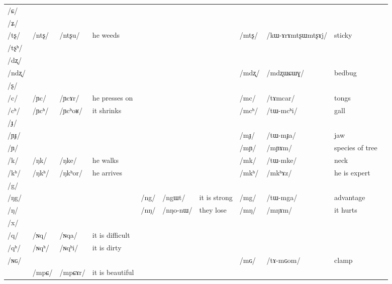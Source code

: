 \documentclass[oldfontcommands,oneside,a4paper,11pt]{article}
\newcommand{\ipa}[1]{\mbox{/#1/}} %
\newcommand{\deux}[1]{/#1/}
\newcommand{\trois}[1]{/#1/}
\begin{document}
\begin{landscape}
\begin{longtable}{l|lll|lll|lll|l}
\ipa{ɕ} 	& 	& 	& 	& 	& 	& 	& 	& 	&  \\
\ipa{ʑ} 	& 	& 	& 	& 	& 	& 	& 	& 	&  \\
\ipa{tʂ} 	& \deux{ntʂ} 	& \ipa{ntʂu} 	& he weeds	& 	& 	& 	& \deux{mtʂ} 	& \ipa{kɯ-ɤrɤmtʂɯmtʂɤj} 	& sticky \\
\ipa{tʂʰ} 	& 	& 	& 	& 	& 	& 	& 	& 	&  \\
\ipa{dʐ} 	& 	& 	& 	& 	& 	& 	& 	& 	&  \\
\ipa{ndʐ} 	& 	& 	& 	& 	& 	& 	& \deux{mdʐ} 	& \ipa{mdʐɯɕɯɣ} 	& bedbug \\
\ipa{ʂ} 	& 	& 	& 	& 	& 	& 	& 	& 	&  \\
\ipa{c} 	& \deux{ɲc} 	& \ipa{ɲcɤr} 	& he presses on	& 	& 	& 	& \deux{mc} 	& \ipa{tɤmcar} 	& tongs \\
\ipa{cʰ} 	& \deux{ɲcʰ} 	& \ipa{ɲcʰoʁ} 	& it shrinks	& 	& 	& 	& \deux{mcʰ} 	& \ipa{tɯ-mcʰi} 	& gall \\
\ipa{ɟ} 	& 	& 	& 	& 	& 	& 	& 	& 	&  \\
\ipa{ɲɟ} 	& 	& 	& 	& 	& 	& 	& \deux{mɟ} 	& \ipa{tɯ-mɟa} 	& jaw \\
\ipa{ɲ} 	& 	& 	& 	& 	& 	& 	& \deux{mɲ} 	& \ipa{mɲɤm} 	& species of tree \\
\ipa{k} 	& \deux{ŋk} 	& \ipa{ŋke} 	& he walks	& 	& 	& 	& \deux{mk} 	& \ipa{tɯ-mke} 	& neck \\
\ipa{kʰ} 	& \deux{ŋkʰ} 	& \ipa{ŋkʰor} 	&he arrives 	& 	& 	& 	& \deux{mkʰ} 	& \ipa{mkʰɤz} 	&he is expert  \\
\ipa{g} 	& 	& 	& 	& 	& 	& 	& 	& 	&  \\
\ipa{ŋg} 	& 	& 	& 	& \deux{ng} 	& \ipa{ngɯt} 	&it is strong 	& \deux{mg} 	& \ipa{tɯ-mga} 	& advantage \\
\ipa{ŋ} 	& 	& 	& 	& \deux{nŋ} 	& \ipa{nŋo-nɯ} 	& they lose	& \deux{mŋ} 	& \ipa{mŋɤm} 	& it hurts \\
\ipa{x} 	& 	& 	& 	& 	& 	& 	& 	& 	&  \\
\ipa{q} 	&   \deux{ɴq} 	& \ipa{ɴqa} 	& it is difficult	& 	&  	&	&	&	&\\
\ipa{qʰ}   	&   \deux{ɴqʰ} 	& \ipa{ɴqʰi} 	& it is dirty	& 	&	& 	& 	& 	&\\
\ipa{ɴɢ}  	& 	&	&	& 	& 	& 	& \deux{mɢ} 	& \ipa{tɤ-mɢom} 	&clamp  \\
\midrule
&\trois{mpɕ} &\ipa{mpɕɤr} & it is beautiful\\
\end{longtable}



\end{landscape}
\end{document}
